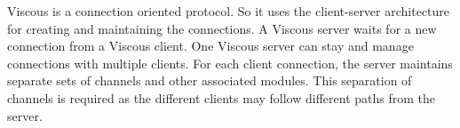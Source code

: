 




Viscous is a connection oriented protocol. So it uses the client-server architecture for creating and maintaining the connections. A Viscous server waits for a new connection from a Viscous client. One Viscous server can stay and manage connections with multiple clients. For each client connection, the server maintains separate sets of channels and other associated modules. This separation of channels is required as the different clients may follow different paths from the server. 

%





